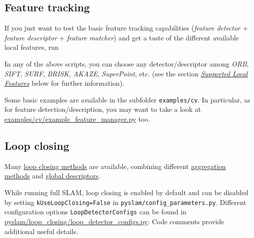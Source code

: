 \documentclass{article}
\newenvironment{Shaded}{\begin{snugshade}}{\end{snugshade}}
\newcommand{\BuiltInTok}[1]{\textcolor[rgb]{0.74,0.68,0.62}{#1}}
\newcommand{\CommentTok}[1]{\textcolor[rgb]{0.00,0.40,1.00}{\textbf{\textit{#1}}}}
\newcommand{\ExtensionTok}[1]{\textcolor[rgb]{0.74,0.68,0.62}{#1}}
\newcommand{\NormalTok}[1]{\textcolor[rgb]{0.74,0.68,0.62}{#1}}
\begin{document}
\hypertarget{feature-tracking}{%
\subsection{Feature tracking}\label{feature-tracking}}

If you just want to test the basic feature tracking capabilities
(\emph{feature detector} + \emph{feature descriptor} + \emph{feature
matcher}) and get a taste of the different available local features, run \\

\begin{scriptsize}
\begin{Shaded}
\end{Shaded}
\end{scriptsize}


In any of the above scripts, you can choose any detector/descriptor
among \emph{ORB}, \emph{SIFT}, \emph{SURF}, \emph{BRISK}, \emph{AKAZE},
\emph{SuperPoint}, etc. (see the section
\emph{\protect\hyperlink{supported-local-features}{Supported Local
Features}} below for further information).

Some basic examples are available in the subfolder
\texttt{examples/cv}. In particular, as for feature
detection/description, you may want to take a look at
\href{https://github.com/luigifreda/pyslam/blob/master/examples/cv/example_feature_manager.py}{examples/cv/example\_feature\_manager.py}
too.

\hypertarget{loop-closing}{%
\subsection{Loop closing}\label{loop-closing}}

Many \protect\hyperlink{loop-closing}{loop closing methods} are
available, combining different
\protect\hyperlink{local-descriptor-aggregation-methods}{aggregation
methods} and \protect\hyperlink{global-descriptors}{global descriptors}.

While running full SLAM, loop closing is enabled by default and can be
disabled by setting \texttt{kUseLoopClosing=False} in
\texttt{pyslam/config\_parameters.py}. Different configuration options
\texttt{LoopDetectorConfigs} can be found in
\href{https://github.com/luigifreda/pyslam/blob/master/pyslam/loop_closing/loop_detector_configs.py}{pyslam/loop\_closing/loop\_detector\_configs.py}: Code comments provide additional useful details.
\end{document}
